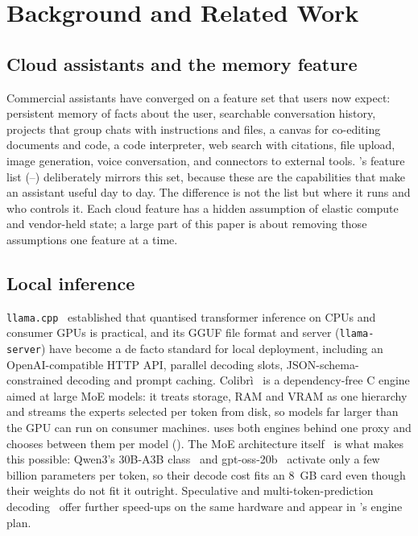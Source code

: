 \section{Background and Related Work}
\label{sec:related}

\subsection{Cloud assistants and the memory feature}
Commercial assistants have converged on a feature set that users now expect: persistent memory of facts about the user, searchable conversation history, projects that group chats with instructions and files, a canvas for co-editing documents and code, a code interpreter, web search with citations, file upload, image generation, voice conversation, and connectors to external tools. \hivi{}'s feature list (--) deliberately mirrors this set, because these are the capabilities that make an assistant useful day to day. The difference is not the list but where it runs and who controls it. Each cloud feature has a hidden assumption of elastic compute and vendor-held state; a large part of this paper is about removing those assumptions one feature at a time.

\subsection{Local inference}
\texttt{llama.cpp}~\cite{llamacpp} established that quantised transformer inference on CPUs and consumer GPUs is practical, and its GGUF file format and server (\texttt{llama-server}) have become a de facto standard for local deployment, including an OpenAI-compatible HTTP API, parallel decoding slots, JSON-schema-constrained decoding and prompt caching. Colibr\`i~\cite{colibri} is a dependency-free C engine aimed at large MoE models: it treats storage, RAM and VRAM as one hierarchy and streams the experts selected per token from disk, so models far larger than the GPU can run on consumer machines. \hivi{} uses both engines behind one proxy and chooses between them per model (). The MoE architecture itself~\cite{shazeer2017,fedus2022} is what makes this possible: Qwen3's 30B-A3B class~\cite{qwen3} and gpt-oss-20b~\cite{gptoss} activate only a few billion parameters per token, so their decode cost fits an 8~GB card even though their weights do not fit it outright. Speculative and multi-token-prediction decoding~\cite{leviathan2023,deepseekv3} offer further speed-ups on the same hardware and appear in \hivi{}'s engine plan.

